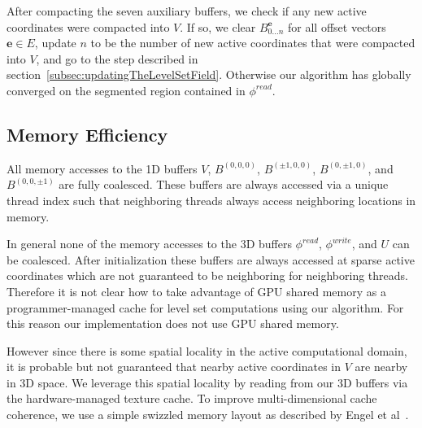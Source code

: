 \documentclass{egpubl}
\newcommand{\leftbracket}{\left(}
\newcommand{\rightbracket}{\right)}
\newcommand{\phiread}{ \phi^{read} }
\newcommand{\phiwrite}{ \phi^{write} }
\begin{document}
{{After compacting the seven auxiliary buffers, we check if any new active coordinates were compacted into $V$. If so, we clear $B^{\mathbf{e}}_{0 \ldots n}$ for all offset vectors $\mathbf{e} \in E$, update $n$ to be the number of new active coordinates that were compacted into $V$, and go to the step described in section~\ref{subsec:updatingTheLevelSetField}. Otherwise our algorithm has globally converged on the segmented region contained in $\phiread$.


\subsection{Memory Efficiency}
\label{subsec:memoryEfficiency}

All memory accesses to the 1D buffers $V$, $B^{ \leftbracket 0,0,0 \rightbracket }$, $B^{ \leftbracket \pm 1, 0, 0 \rightbracket }$, $B^{ \leftbracket 0, \pm 1, 0 \rightbracket }$, and $B^{ \leftbracket 0, 0, \pm 1 \rightbracket }$ are fully coalesced. These buffers are always accessed via a unique thread index such that neighboring threads always access neighboring locations in memory.

In general none of the memory accesses to the 3D buffers $\phiread$, $\phiwrite$, and $U$ can be coalesced. After initialization these buffers are always accessed at sparse active coordinates which are not guaranteed to be neighboring for neighboring threads. Therefore it is not clear how to take advantage of GPU shared memory as a programmer-managed cache for level set computations using our algorithm. For this reason our implementation does not use GPU shared memory.

However since there is some spatial locality in the active computational domain, it is probable but not guaranteed that nearby active coordinates in $V$ are nearby in 3D space. We leverage this spatial locality by reading from our 3D buffers via the hardware-managed texture cache. To improve multi-dimensional cache coherence, we use a simple swizzled memory layout as described by Engel et al~\cite{Engel2006}.


}}
\end{document}
